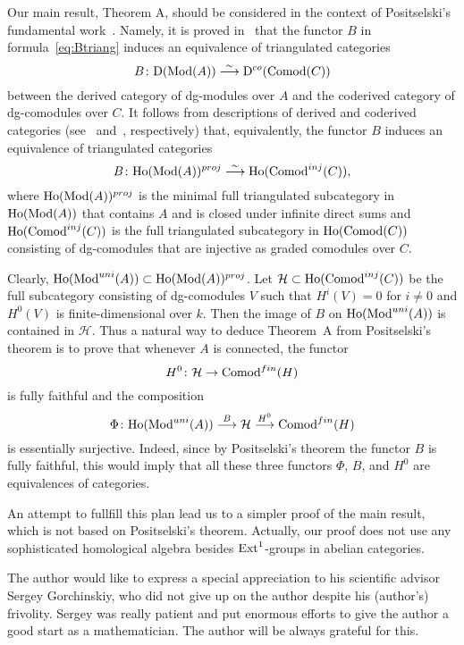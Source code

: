 \documentclass[10pt,russian]{article}
\theoremstyle{plain}
\theoremstyle{definition}
\newcommand{\Hc}{\mathcal{H}}
\newcommand{\Mod}{{\rm Mod}}
\newcommand{\Comod}{{\rm Comod}}
\newcommand{\Ext}{{\rm Ext}}
\newcommand{\Ho}{{\rm Ho}}
\begin{document}

\medskip

Our main result, Theorem A, should be considered in the context of Positselski's fundamental work~\cite{Pos}. Namely, it is proved in~\cite[Theorem~6.3(a)]{Pos} that the functor $B$ in formula~\eqref{eq:Btriang} induces an equivalence of triangulated categories
$$
B\colon {\rm D}(\Mod(A))\stackrel{\sim}\longrightarrow {\rm D}^{co}(\Comod(C))
$$
between the derived category of dg-modules over $A$ and the coderived category of dg-comodules over $C$. It follows from descriptions of derived and coderived categories (see~\cite[Theorem~1.4(b)]{Pos} and~\cite[Theorem~4.4.(c)]{Pos}, respectively) that, equivalently, the functor $B$ induces an equivalence of triangulated categories
$$
B\colon \Ho(\Mod(A))^{proj}\stackrel{\sim}\longrightarrow \Ho(\Comod^{inj}(C)),
$$
where $\Ho(\Mod(A))^{proj}$ is the minimal full triangulated subcategory in $\Ho(\Mod(A))$ that contains $A$ and is closed under infinite direct sums and $\Ho(\Comod^{inj}(C))$ is the full triangulated subcategory in $\Ho(\Comod(C))$ consisting of dg-comodules that are injective as graded comodules over $C$.

Clearly, $\Ho(\Mod^{uni}(A))\subset \Ho(\Mod(A))^{proj}$. Let $\Hc\subset \Ho(\Comod^{inj}(C))$ be the full subcategory consisting of dg-comodules $V$ such that $H^i(V)=0$ for $i\ne 0$ and $H^0(V)$ is finite-dimensional over $k$. Then the image of $B$ on $\Ho(\Mod^{uni}(A))$ is contained in $\Hc$. Thus a natural way to deduce Theorem~A from Positselski's theorem is to prove that whenever $A$ is connected, the functor
$$
H^0\colon \Hc\to \Comod^{fin}(H)
$$
is fully faithful and the composition
$$
\Phi\colon \Ho(\Mod^{uni}(A))\stackrel{B}\longrightarrow \Hc\stackrel{H^0}\longrightarrow \Comod^{fin}(H)
$$
is essentially surjective. Indeed, since by Positselski's theorem the functor $B$ is fully faithful, this would imply that all these three functors $\Phi$, $B$, and $H^0$ are equivalences of categories.

An attempt to fullfill this plan lead us to a simpler proof of the main result, which is not based on Positselski's theorem. Actually, our proof does not use any sophisticated homological algebra besides $\Ext^1$-groups in abelian categories.


\medskip
	
The author would like to express a special appreciation to his scientific advisor Sergey Gorchinskiy, who did not give up on the author despite his (author's) frivolity. Sergey was really patient and put enormous efforts to give the author a good start as a mathematician. The author will be always grateful for this.
\end{document}
